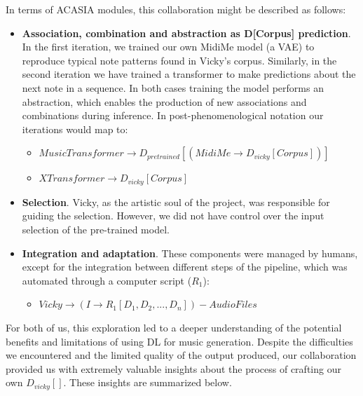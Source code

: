 In terms of ACASIA modules, this collaboration might be described as follows:

\begin{itemize}
\item \textbf{Association, combination and abstraction as D[Corpus] prediction}. In the first iteration, we trained our own MidiMe model (a VAE) to reproduce typical note patterns found in Vicky's corpus. Similarly, in the second iteration we have trained a transformer to make predictions about the next note in a sequence. In both cases training the model performs an abstraction, which enables the production of new associations and combinations during inference. In post-phenomenological notation our iterations would map to:
\begin{itemize}
\singlespacing
\item $ MusicTransformer \rightarrow D_{pretrained}[(MidiMe \rightarrow D_{vicky}[Corpus])]  $ 
\item $ XTransformer \rightarrow D_{vicky}[Corpus]$
\end{itemize}
\item \textbf{Selection}. Vicky, as the artistic soul of the project, was responsible for guiding the selection. However, we did not have control over the input selection of the pre-trained model.
\item \textbf{Integration and adaptation}. These components were managed by humans, except for the integration between different steps of the pipeline, which was automated through a computer script ($R_1$):
\begin{itemize}
\singlespacing
\item $Vicky \rightarrow (I \rightarrow R_1[D_1,D_2,...,D_n]) - Audio Files $
\end{itemize}

\end{itemize}

For both of us, this exploration led to a deeper understanding of the potential benefits and limitations of using DL for music generation. Despite the difficulties we encountered and the limited quality of the output produced, our collaboration provided us with extremely valuable insights about the process of crafting our own $D_{vicky}[]$. These insights are summarized below.

